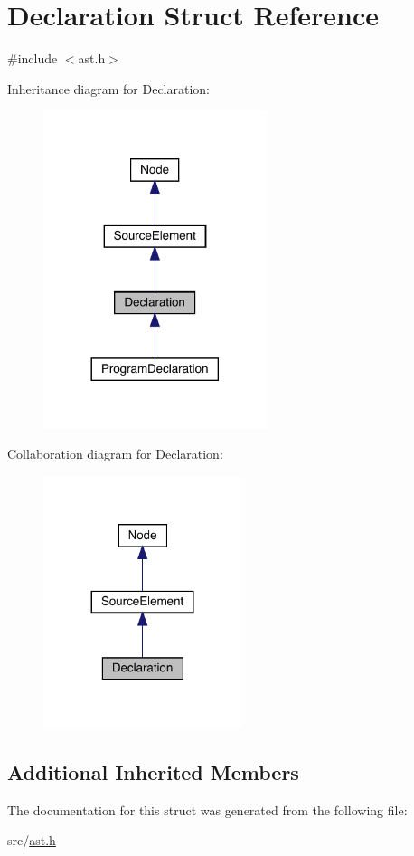 \hypertarget{struct_declaration}{}\section{Declaration Struct Reference}
\label{struct_declaration}


{\ttfamily \#include $<$ast.\+h$>$}



Inheritance diagram for Declaration\+:\nopagebreak
\begin{figure}[H]
\begin{center}
\leavevmode
\includegraphics[width=185pt]{struct_declaration__inherit__graph}
\end{center}
\end{figure}


Collaboration diagram for Declaration\+:\nopagebreak
\begin{figure}[H]
\begin{center}
\leavevmode
\includegraphics[width=164pt]{struct_declaration__coll__graph}
\end{center}
\end{figure}
\subsection*{Additional Inherited Members}


The documentation for this struct was generated from the following file\+:\begin{DoxyCompactItemize}
\item 
src/\hyperlink{ast_8h}{ast.\+h}\end{DoxyCompactItemize}

